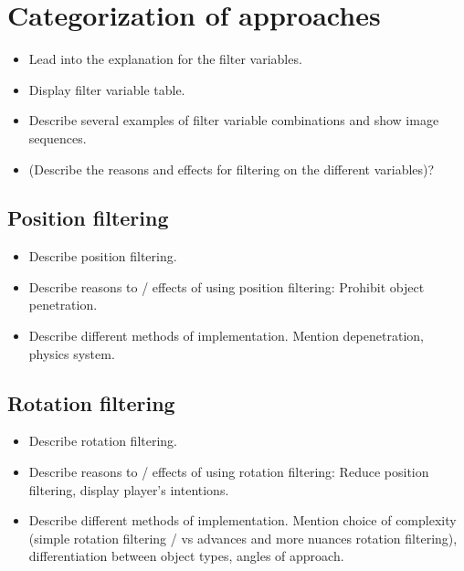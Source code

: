 \section{Categorization of approaches}
\label{sec:categorizationOfApproaches}
\begin{itemize}
\item Lead into the explanation for the filter variables.
\item Display filter variable table.
\item Describe several examples of filter variable combinations and show image sequences.
\item (Describe the reasons and effects for filtering on the different variables)?
\end{itemize}


\subsection{Position filtering}
\label{subsec:categoryPositionFiltering}
\begin{itemize}
\item Describe position filtering.
\item Describe reasons to / effects of using position filtering: Prohibit object penetration.
\item Describe different methods of implementation. Mention depenetration, physics system.
\end{itemize}


\subsection{Rotation filtering}
\label{subsec:categoryRotationFiltering}
\begin{itemize}
\item Describe rotation filtering.
\item Describe reasons to / effects of using rotation filtering: Reduce position filtering, display player's intentions.
\item Describe different methods of implementation. Mention choice of complexity (simple rotation filtering / vs advances and more nuances rotation filtering), differentiation between object types, angles of approach.
\end{itemize}

